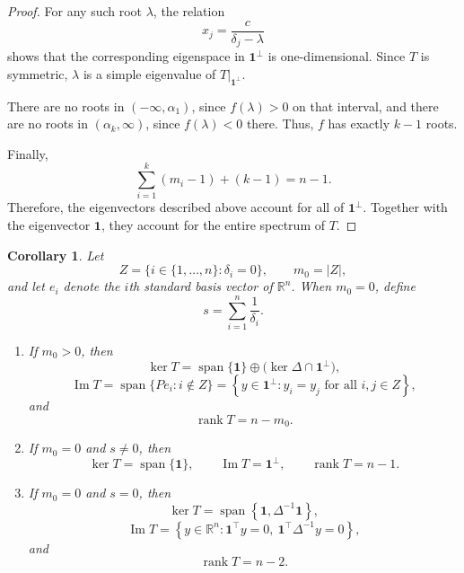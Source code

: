 \documentclass[12pt,a4paper]{amsart}
\newtheorem{corollary}[theorem]{Corollary}
\theoremstyle{remark}
\theoremstyle{definition}
\newcommand{\1}{\mathbf{1}}
\newcommand{\0}{\mathbf{0}}
\begin{document}
\begin{proof}
For any such root $\lambda$, the relation
\[
x_j=\frac{c}{\delta_j-\lambda}
\]
shows that the corresponding eigenspace in $\mathbf{1}^{\perp}$ is
one-dimensional. Since $T$ is symmetric, $\lambda$ is a simple
eigenvalue of $\left.T\right|_{\mathbf{1}^{\perp}}$.

There are no roots in $(-\infty,\alpha_1)$, since $f(\lambda)>0$ on
that interval, and there are no roots in $(\alpha_k,\infty)$, since
$f(\lambda)<0$ there. Thus, $f$ has exactly $k-1$ roots.

Finally,
\[
\sum_{i=1}^{k}(m_i-1)+(k-1)=n-1.
\]
Therefore, the eigenvectors described above account for all of
$\mathbf{1}^{\perp}$. Together with the eigenvector $\mathbf{1}$,
they account for the entire spectrum of $T$.
\end{proof}

\begin{corollary}\label{funda subspaces T}
Let
\[
Z=\{i\in\{1,\ldots,n\}:\delta_i=0\},
\qquad
m_0=|Z|,
\]
and let $e_i$ denote the $i$th standard basis vector of
$\mathbb{R}^n$. When $m_0=0$, define
\[
s=\sum_{i=1}^{n}\frac{1}{\delta_i}.
\]

\begin{enumerate}
\item[(i)]
If $m_0>0$, then
\[
\ker T
=
\operatorname{span}\{\mathbf{1}\}
\oplus
\bigl(\ker\Delta\cap\mathbf{1}^{\perp}\bigr),
\]
\[
\operatorname{Im}T
=
\operatorname{span}\{Pe_i:i\notin Z\}
=
\left\{
y\in\mathbf{1}^{\perp}:
y_i=y_j\text{ for all }i,j\in Z
\right\},
\]
and
\[
\operatorname{rank}T=n-m_0.
\]

\item[(ii)]
If $m_0=0$ and $s\neq 0$, then
\[
\ker T=\operatorname{span}\{\mathbf{1}\},
\qquad
\operatorname{Im}T=\mathbf{1}^{\perp},
\qquad
\operatorname{rank}T=n-1.
\]

\item[(iii)]
If $m_0=0$ and $s=0$, then
\[
\ker T
=
\operatorname{span}
\left\{
\mathbf{1},\Delta^{-1}\mathbf{1}
\right\},
\]
\[
\operatorname{Im}T
=
\left\{
y\in\mathbb{R}^n:
\mathbf{1}^{\top}y=0,\ 
\mathbf{1}^{\top}\Delta^{-1}y=0
\right\},
\]
and
\[
\operatorname{rank}T=n-2.
\]
\end{enumerate}
\end{corollary}
\end{document}
